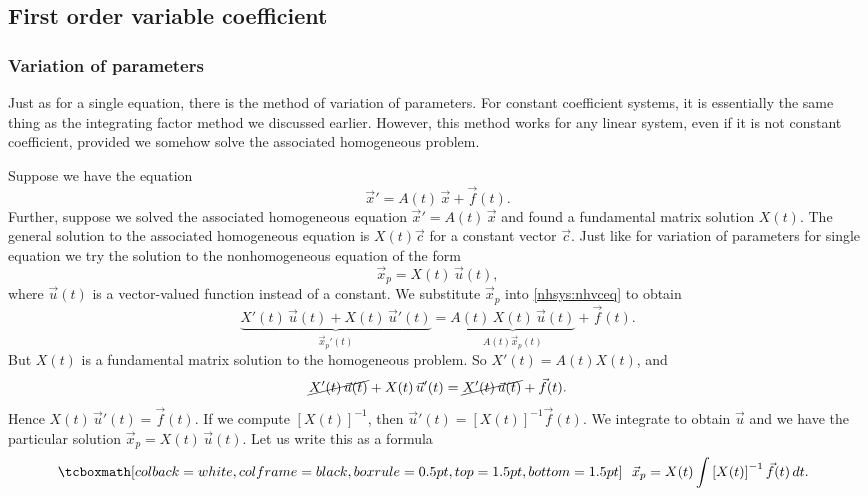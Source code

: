 \subsection{First order variable coefficient}

\subsubsection{Variation of parameters}

Just as for a single equation, there is the method of
variation of parameters.
For constant coefficient systems, it is essentially
the same thing as the integrating factor method we discussed earlier.
However, this method works for any linear system, even if it is not
constant coefficient, provided we somehow solve the associated
homogeneous problem.

Suppose we have the equation
\begin{equation} \label{nhsys:nhvceq}
{\vec{x}}' = A(t) \, \vec{x} + \vec{f}(t) .
\end{equation}
Further, suppose we solved the associated homogeneous equation
${\vec{x}}' = A(t) \, \vec{x}$ and found
a fundamental matrix solution
$X(t)$.  The general solution to the associated homogeneous equation
is $X(t) \vec{c}$ for a constant vector $\vec{c}$.  Just like for
variation of parameters for single equation we try the solution
to the nonhomogeneous equation of the form
\begin{equation*}
\vec{x}_p = X(t)\, \vec{u}(t) ,
\end{equation*}
where $\vec{u}(t)$ is a vector-valued function instead of a constant.
We substitute $\vec{x}_p$ into \eqref{nhsys:nhvceq} to obtain
\begin{equation*}
\underbrace{X'(t)\, \vec{u}(t) + X(t)\, {\vec{u}}'(t)}%
_{{\vec{x}_p}'(t)}
=
\underbrace{A(t)\, X(t)\, \vec{u}(t)}%
_{A(t) \vec{x}_p (t)} 
 + \vec{f}(t) .
\end{equation*}
But $X(t)$ is a fundamental matrix solution to the homogeneous problem.
So $X'(t) = A(t)X(t)$, and
\begin{equation*}
\cancel{X'(t)\, \vec{u}(t)} + X(t)\, {\vec{u}}'(t)
=
\cancel{X'(t)\, \vec{u}(t)} + \vec{f}(t) .
\end{equation*}
Hence
$X(t)\, {\vec{u}}'(t) = \vec{f}(t)$.  If we compute
$\left[X(t)\right]^{-1}$,
then
${\vec{u}}'(t) = \left[X(t)\right]^{-1}\vec{f}(t)$.  We integrate
to obtain $\vec{u}$ and we have the particular solution
$\vec{x}_p = X(t)\, \vec{u}(t)$.
Let us write this as a formula
\begin{equation*}
\mybxbg{~~
\vec{x}_p = 
X(t)
\int \left[X(t)\right]^{-1}\vec{f}(t) \, dt .
~~}
\end{equation*}

